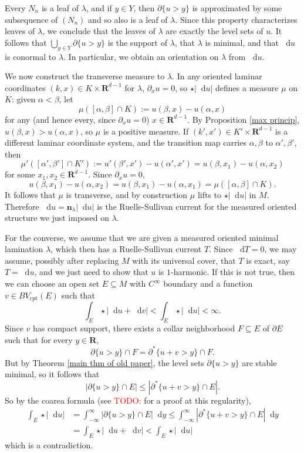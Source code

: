 \documentclass[reqno,11pt]{amsart}
\newcommand{\RR}{\mathbf{R}}
\newcommand*\dif{\mathop{}\!\mathrm{d}}
\newcommand{\normal}{\mathbf n}
\newcommand{\cpt}{\mathrm{cpt}}
\theoremstyle{definition}
\numberwithin{equation}{section}
\newcommand\todo[1]{\textcolor{red}{TODO: #1}}
\begin{document}
Every $N_n$ is a leaf of $\lambda$, and if $y \in Y$, then $\partial \{u > y\}$ is approximated by some subsequence of $(N_n)$ and so also is a leaf of $\lambda$.
Since this property characterizes leaves of $\lambda$, we conclude that the leaves of $\lambda$ are exactly the level sets of $u$.
It follows that $\bigcup_{y \in Y} \partial \{u > y\}$ is the support of $\lambda$, that $\lambda$ is minimal, and that $\dif u$ is conormal to $\lambda$.
In particular, we obtain an orientation on $\lambda$ from $\dif u$.

We now construct the transverse measure to $\lambda$.
In any oriented laminar coordinates $(k, x) \in K \times \RR^{d - 1}$ for $\lambda$, $\partial_x u = 0$, so $\star |\dif u|$ defines a measure $\mu$ on $K$: given $\alpha < \beta$, let
$$\mu([\alpha, \beta] \cap K) := u(\beta, x) - u(\alpha, x)$$
for any (and hence every, since $\partial_x u = 0$) $x \in \RR^{d - 1}$.
By Proposition \ref{max princip}, $u(\beta, x) > u(\alpha, x)$, so $\mu$ is a positive measure.
If $(k', x') \in K' \times \RR^{d - 1}$ is a different laminar coordinate system, and the transition map carries $\alpha, \beta$ to $\alpha', \beta'$, then
$$\mu'([\alpha', \beta'] \cap K') := u'(\beta', x') - u(\alpha', x') = u(\beta, x_1) - u(\alpha, x_2)$$
for some $x_1, x_2 \in \RR^{d - 1}$. Since $\partial_x u = 0$,
$$u(\beta, x_1) - u(\alpha, x_2) = u(\beta, x_1) - u(\alpha, x_1) = \mu([\alpha, \beta] \cap K).$$
It follows that $\mu$ is transverse, and by construction $\mu$ lifts to $\star |\dif u|$ in $M$.
Therefore $\dif u = \normal_\lambda |\dif u|$ is the Ruelle-Sullivan current for the measured oriented structure we just imposed on $\lambda$.

For the converse, we assume that we are given a measured oriented minimal lamination $\lambda$, which then has a Ruelle-Sullivan current $T$.
Since $\dif T = 0$, we may assume, possibly after replacing $M$ with its universal cover, that $T$ is exact, say $T = \dif u$, and we just need to show that $u$ is $1$-harmonic.
If this is not true, then we can choose an open set $E \subseteq M$ with $C^\infty$ boundary and a function $v \in BV_\cpt(E)$ such that
$$\int_E \star |\dif u + \dif v| < \int_E \star |\dif u| < \infty.$$
Since $v$ has compact support, there exists a collar neighborhood $F \subseteq E$ of $\partial E$ such that for every $y \in \RR$,
$$\partial \{u > y\} \cap F = \partial^* \{u + v > y\} \cap F.$$
But by Theorem \ref{main thm of old paper}, the level sets $\partial \{u > y\}$ are stable minimal, so it follows that
$$|\partial \{u > y\} \cap E| \leq |\partial^* \{u + v > y\} \cap E|.$$
So by the coarea formula (see \todo{\cite{BackusFLG}} for a proof at this regularity),
\begin{align*}
\int_E \star |\dif u| &= \int_{-\infty}^\infty |\partial \{u > y\} \cap E| \dif y \leq \int_{-\infty}^\infty |\partial^* \{u + v > y\} \cap E| \dif y \\
&= \int_E \star |\dif u + \dif v| < \int_E \star |\dif u|
\end{align*}
which is a contradiction.


\printbibliography
\end{document}
